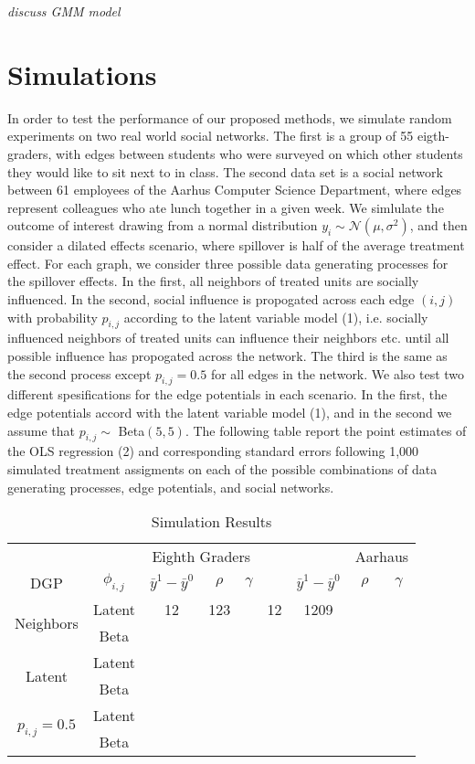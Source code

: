 \documentclass{article}
\begin{document}
\textit{discuss GMM model}

\section{Simulations}

In order to test the performance of our proposed methods, we simulate random experiments on two real world social networks. The first is a group of 55 eigth-graders, with edges between 
students who were surveyed on which other students they would like to sit next to in class. The second data set is a social network between 61 employees of the Aarhus Computer Science Department, where 
edges represent colleagues who ate lunch together in a given week. We simlulate the outcome of interest drawing from a normal distribution $y_{i} \sim \mathcal{N}(\mu, \sigma^2)$, and then consider a dilated effects scenario, 
where spillover is half of the average treatment effect. For each graph, we consider three possible data generating processes for the spillover effects. In the first, all neighbors of treated units are socially influenced. 
In the second, social influence is propogated across each edge $(i, j)$ with probability $p_{i,j}$ according to the latent variable model (1), i.e. socially influenced neighbors of treated units can influence their neighbors etc. until all possible influence
has propogated across the network. The third is the same as the second process except $p_{i,j} = 0.5$ for all edges in the network. We also test two different spesifications for the edge potentials in each scenario. In the first, the edge potentials accord with the latent variable model (1), and in the second we assume that $p_{i,j} \sim$ Beta$(5, 5)$. The following table report the point estimates of the OLS regression (2) and corresponding standard errors following 1,000 simulated 
treatment assigments on each of the possible combinations of data generating processes, edge potentials, and social networks.  

\begin{table}[h]
  \caption{Simulation Results}
  \label{sample-table}
  \centering
  \begin{tabular}{ccccccccc}
    \toprule
    & & \multicolumn{3}{c}{Eighth Graders} & & & \multicolumn{2}{c}{Aarhaus}              \\
    \cmidrule{3-5} \cmidrule{7-9}
    DGP & $\phi_{i,j}$ & $\bar{y}^1 - \bar{y}^0$ & $\rho$ & $\gamma$ & & $\bar{y}^1 - \bar{y}^0$ & $\rho$ & $\gamma$\\
    \midrule
    \multirow{ 2}{*}{Neighbors} & Latent & 12 & 123 & & 12 & 1209     \\
    \cmidrule{2-9}
    & Beta \\
    \midrule
    \multirow{ 2}{*}{Latent}& Latent      & \\
    \cmidrule{2-7}
    & Beta  \\
    \midrule
    \multirow{ 2}{*}{$p_{i,j} = 0.5$}& Latent      & \\
    \cmidrule{2-7}
    & Beta  \\
    \bottomrule
  \end{tabular}
\end{table}
\end{document}
